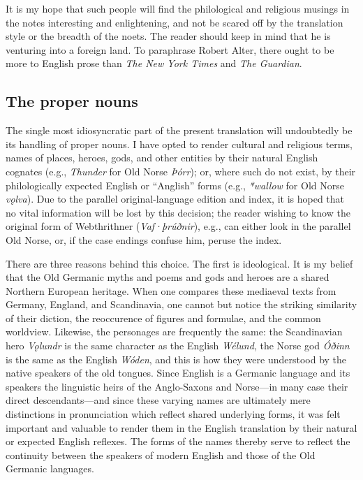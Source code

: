     It is my hope that such people will find the philological and religious musings in the notes interesting and enlightening, and not be scared off by the translation style or the breadth of the noets.  The reader should keep in mind that he is venturing into a foreign land.  To paraphrase Robert Alter, there ought to be more to English prose than \emph{The New York Times} and \emph{The Guardian}.

    \subsection{The proper nouns}

      The single most idiosyncratic part of the present translation will undoubtedly be its handling of proper nouns.  I have opted to render cultural and religious terms, names of places, heroes, gods, and other entities by their natural English cognates (e.g., \emph{Thunder} for Old Norse \emph{Þórr}); or, where such do not exist, by their philologically expected English or “Anglish” forms (e.g., \emph{*wallow} for Old Norse \emph{vǫlva}).  Due to the parallel original-language edition and index, it is hoped that no vital information will be lost by this decision; the reader wishing to know the original form of Webthrithner (\emph{Vaf·þrúðnir}), e.g., can either look in the parallel Old Norse, or, if the case endings confuse him, peruse the index.

      There are three reasons behind this choice.  The first is ideological.  It is my belief that the Old Germanic myths and poems and gods and heroes are a shared Northern European heritage.  When one compares these mediaeval texts from Germany, England, and Scandinavia, one cannot but notice the striking similarity of their diction, the reoccurence of figures and formulae, and the common worldview.  Likewise, the personages are frequently the same: the Scandinavian hero \emph{Vǫlundr} is the same character as the English \emph{Wélund}, the Norse god \emph{Óðinn} is the same as the English \emph{Wóden}, and this is how they were understood by the native speakers of the old tongues.  Since English is a Germanic language and its speakers the linguistic heirs of the Anglo-Saxons and Norse---in many case their direct descendants---and since these varying names are ultimately mere distinctions in pronunciation which reflect shared underlying forms, it was felt important and valuable to render them in the English translation by their natural or expected English reflexes.  The forms of the names thereby serve to reflect the continuity between the speakers of modern English and those of the Old Germanic languages.

